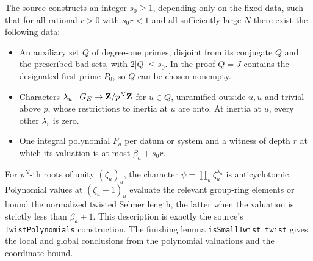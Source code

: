 \documentclass[11pt]{article}
\theoremstyle{remark}\newtheorem{remark}[theorem]{Remark}
\begin{document}
The source constructs an integer $s_0\ge1$, depending only on the fixed
data, such that for all rational $r>0$ with $s_0r<1$ and all sufficiently
large $N$ there exist the following data:
\begin{itemize}
\item An auxiliary set $Q$ of degree-one primes, disjoint from its
conjugate $\overline Q$ and the prescribed bad sets, with
$2|Q|\le s_0$. In the proof $Q=J$ contains the designated first prime
$P_0$, so $Q$ can be chosen nonempty.
\item Characters $\lambda_u:G_E\to\mathbf Z/p^N\mathbf Z$ for $u\in Q$, unramified
outside $u,\bar u$ and trivial above $p$, whose restrictions to inertia
at $u$ are onto. At inertia at $u$, every other $\lambda_v$ is zero.
\item One integral polynomial $F_a$ per datum or system and a witness
of depth $r$ at which its valuation is at most $\beta_a+s_0r$.
\end{itemize}
For $p^N$-th roots of unity $(\zeta_u)_u$, the character
$\psi=\prod_u\zeta_u^{\lambda_u}$ is anticyclotomic. Polynomial
values at $(\zeta_u-1)_u$ evaluate the relevant group-ring elements or
bound the normalized twisted Selmer length, the latter when the
valuation is strictly less than $\beta_a+1$. This description is exactly
the source's \texttt{TwistPolynomials} construction. The finishing
lemma \texttt{isSmallTwist\_twist} gives the local and global conclusions
from the polynomial valuations and the coordinate bound.
\end{document}
